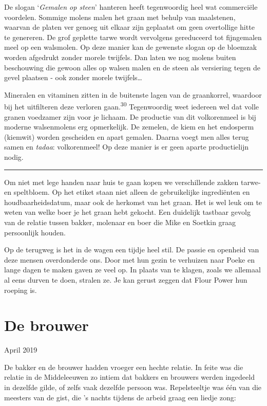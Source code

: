 \documentclass[
  11pt,
  dutch,
]{memoir}
\begin{document}
De slogan `\emph{Gemalen op steen}' hanteren heeft tegenwoordig heel wat
commerciële voordelen. Sommige molens malen het graan met behulp van
maalstenen, waarvan de platen ver genoeg uit elkaar zijn geplaatst om
geen overtollige hitte te genereren. De grof geplette tarwe wordt
vervolgens gereduceerd tot fijngemalen meel op een walsmolen. Op deze
manier kan de gewenste slogan op de bloemzak worden afgedrukt zonder
morele twijfels. Dan laten we nog molens buiten beschouwing die gewoon
alles op walsen malen en de steen als versiering tegen de gevel plaatsen
- ook zonder morele twijfels\ldots{}

Mineralen en vitaminen zitten in de buitenste lagen van de graankorrel,
waardoor bij het uitfilteren deze verloren gaan.\textsuperscript{30}
Tegenwoordig weet iedereen wel dat volle granen voedzamer zijn voor je
lichaam. De productie van dit volkorenmeel is bij moderne walsenmolens
erg opmerkelijk. De zemelen, de kiem en het endosperm (kiemwit) worden
gescheiden en apart gemalen. Daarna voegt men alles terug samen en
\emph{tadaa}: volkorenmeel! Op deze manier is er geen aparte
productielijn nodig.

\pfbreak

Om niet met lege handen naar huis te gaan kopen we verschillende zakken
tarwe- en speltbloem. Op het etiket staan niet alleen de gebruikelijke
ingrediënten en houdbaarheidsdatum, maar ook de herkomst van het graan.
Het is wel leuk om te weten van welke boer je het graan hebt gekocht.
Een duidelijk tastbaar gevolg van de relatie tussen bakker, molenaar en
boer die Mike en Soetkin graag persoonlijk houden.

Op de terugweg is het in de wagen een tijdje heel stil. De passie en
openheid van deze mensen overdonderde ons. Door met hun gezin te
verhuizen naar Poeke en lange dagen te maken gaven ze veel op. In plaats
van te klagen, zoals we allemaal al eens durven te doen, stralen ze. Je
kan gerust zeggen dat Flour Power hun roeping is.

\hypertarget{de-brouwer}{%
\section{De brouwer}\label{de-brouwer}}

\begin{flushright}
April 2019
\end{flushright}

De bakker en de brouwer hadden vroeger een hechte relatie. In feite was
die relatie in de Middeleeuwen zo intiem dat bakkers en brouwers werden
ingedeeld in dezelfde gilde, of zelfs vaak dezelfde persoon was.
Repelsteeltje was één van die meesters van de gist, die 's nachts
tijdens de arbeid graag een liedje zong:
\end{document}
